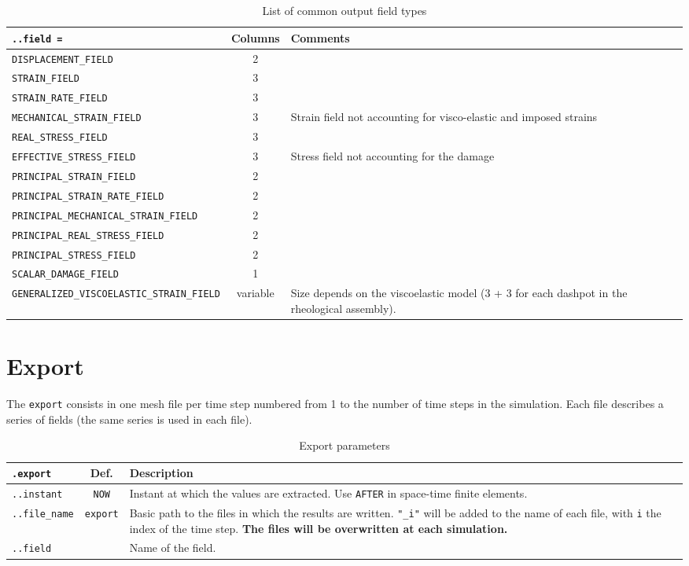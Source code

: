 \documentclass[10pt]{article}
\begin{document}
\begin{table}[h!]
\begin{tabularx}{\textwidth}{lcX}
\verb+..field =+ & Columns & Comments\\
\hline
\verb+DISPLACEMENT_FIELD+ & 2 & \\	
\verb+STRAIN_FIELD+ & 3 & \\	
\verb+STRAIN_RATE_FIELD+ & 3 & \\	
\verb+MECHANICAL_STRAIN_FIELD+ & 3 & Strain field not accounting for visco-elastic and imposed strains\\	
\verb+REAL_STRESS_FIELD+ & 3 & \\	
\verb+EFFECTIVE_STRESS_FIELD+ & 3 & Stress field not accounting for the damage \\	
\verb+PRINCIPAL_STRAIN_FIELD+ & 2 & \\	
\verb+PRINCIPAL_STRAIN_RATE_FIELD+ & 2 & \\	
\verb+PRINCIPAL_MECHANICAL_STRAIN_FIELD+ & 2 & \\	
\verb+PRINCIPAL_REAL_STRESS_FIELD+ & 2 & \\	
\verb+PRINCIPAL_STRESS_FIELD+ & 2 &  \\	
\verb+SCALAR_DAMAGE_FIELD+ & 1 & \\
\verb+GENERALIZED_VISCOELASTIC_STRAIN_FIELD+ & variable & Size depends on the viscoelastic model (3 + 3 for each dashpot in the rheological assembly).\\	
\hline
\end{tabularx}
\caption{List of common output field types}
\end{table}

\section{Export}

The \verb+export+ consists in one mesh file per time step numbered from 1 to the number of time steps in the simulation. 
Each file describes a series of fields (the same series is used in each file).

\begin{table}[h!]
\begin{tabularx}{\textwidth}{lcX}
\verb+.export+ & Def. & Description\\
\hline
\verb+..instant+ & \verb+NOW+  & Instant at which the values are extracted. Use \verb+AFTER+ in space-time finite elements.\\	
\verb+..file_name+ & \verb+export+ & Basic path to the files in which the results are written. \verb+"_i"+ will be added to the name of each file, with \verb+i+ the index of the time step. \textbf{The files will be overwritten at each simulation.}\\
\verb+..field+ & & Name of the field. \\
\hline
\end{tabularx}
\caption{Export parameters}
\end{table}
\end{document}
